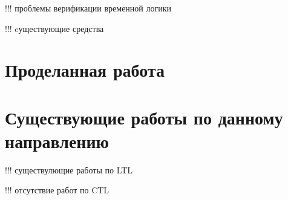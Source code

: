 \documentclass[a4paper,notitlepage,14pt]{article}
\begin{document}
!!! проблемы верификации временной логики

!!! cуществующие средства

\section{Проделанная работа}
\label{sec:my-work}

\section{Существующие работы по данному направлению}
\label{sec:other-work}

!!! существулющие работы по LTL

!!! отсутствие работ по CTL



\end{document}
